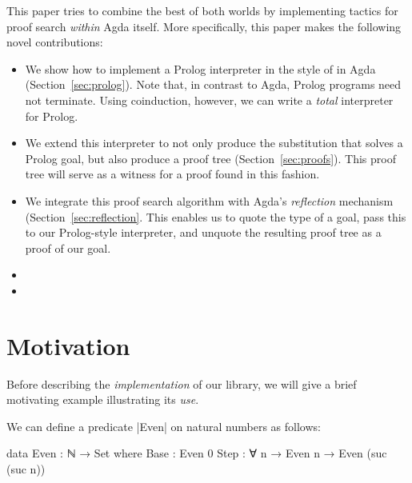 \documentclass[preprint]{sigplanconf}
\begin{document}
This paper tries to combine the best of both worlds by implementing
tactics for proof search \emph{within} Agda itself. More specifically,
this paper makes the following novel contributions:

\begin{itemize}
\item
  We show how to implement a Prolog interpreter in the style of
  \citet{stutterheim} in Agda (Section~\ref{sec:prolog}). Note that,
  in contrast to Agda, Prolog programs need not terminate. Using coinduction,
  however, we can write a \emph{total} interpreter for Prolog.
\item
  We extend this interpreter to not only produce the substitution that
  solves a Prolog goal, but also produce a proof tree
  (Section~\ref{sec:proofs}). This proof tree will serve
  as a witness for a proof found in this fashion.
\item
  We integrate this proof search algorithm with Agda's \emph{reflection}
  mechanism (Section~\ref{sec:reflection}. This enables
  us to quote the type of a goal, pass this to our Prolog-style
  interpreter, and unquote the resulting proof tree as a proof of our
  goal.
\item
   
\item
\end{itemize}



\section{Motivation}
\label{sec:motivation}

Before describing the \emph{implementation} of our library, we will
give a brief motivating example illustrating its \emph{use}.

We can define a predicate |Even| on natural numbers as follows:

\begin{code}
  data Even : ℕ → Set where
    Base : Even 0
    Step : ∀ {n} → Even n → Even (suc (suc n))
\end{code}
\end{document}
